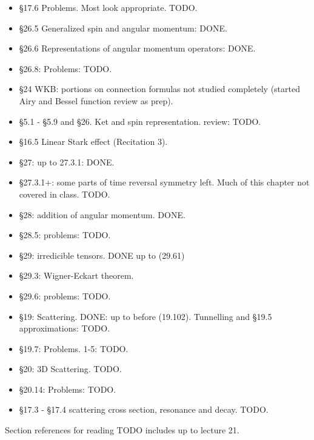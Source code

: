 \begin{itemize}
\item \S 17.6 Problems.  Most look appropriate.  TODO.
\item \S 26.5 Generalized spin and angular momentum: DONE.
\item \S 26.6 Representations of angular momentum operators: DONE.
\item \S 26.8: Problems: TODO.
\item \S 24 WKB: portions on connection formulas not studied completely (started Airy and Bessel function review as prep).
\item \S 5.1 - \S 5.9 and \S 26.  Ket and spin representation.  review: TODO.
\item \S 16.5 Linear Stark effect (Recitation 3).
\item \S 27: up to 27.3.1: DONE.
\item \S 27.3.1+: some parts of time reversal symmetry left.  Much of this chapter not covered in class.  TODO.
\item \S 28: addition of angular momentum.  DONE.
\item \S 28.5: problems: TODO.
\item \S 29: irredicible tensors.  DONE up to (29.61)
\item \S 29.3: Wigner-Eckart theorem.
\item \S 29.6: problems: TODO.
\item \S 19: Scattering.  DONE: up to before (19.102).  Tunnelling and \S 19.5 approximations: TODO.
\item \S 19.7: Problems. 1-5: TODO.
\item \S 20: 3D Scattering. TODO.
\item \S 20.14: Problems: TODO.
\item \S 17.3 - \S 17.4 scattering cross section, resonance and decay.  TODO.
\end{itemize}

Section references for reading TODO includes up to lecture 21.
